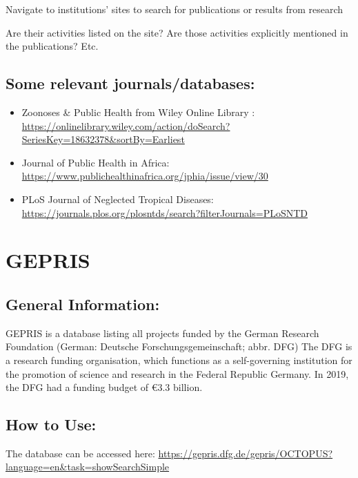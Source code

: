 \documentclass[
]{book}
\begin{document}
Navigate to institutions' sites to search for publications or results from research

Are their activities listed on the site? Are those activities explicitly mentioned in the publications? Etc.

\hypertarget{some-relevant-journalsdatabases}{%
\subsection{Some relevant journals/databases:}\label{some-relevant-journalsdatabases}}

\begin{itemize}
\item
  Zoonoses \& Public Health from Wiley Online Library : \url{https://onlinelibrary.wiley.com/action/doSearch?SeriesKey=18632378\&sortBy=Earliest}
\item
  Journal of Public Health in Africa: \url{https://www.publichealthinafrica.org/jphia/issue/view/30}
\item
  PLoS Journal of Neglected Tropical Diseases: \url{https://journals.plos.org/plosntds/search?filterJournals=PLoSNTD}
\end{itemize}

\hypertarget{update-gepris}{%
\section{GEPRIS}\label{update-gepris}}

\hypertarget{general-information-1}{%
\subsection{General Information:}\label{general-information-1}}

GEPRIS is a database listing all projects funded by the German Research Foundation (German: Deutsche Forschungsgemeinschaft; abbr. DFG) The DFG is a research funding organisation, which functions as a self-governing institution for the promotion of science and research in the Federal Republic Germany. In 2019, the DFG had a funding budget of €3.3 billion.

\hypertarget{how-to-use}{%
\subsection{How to Use:}\label{how-to-use}}

The database can be accessed here: \url{https://gepris.dfg.de/gepris/OCTOPUS?language=en\&task=showSearchSimple}
\end{document}
